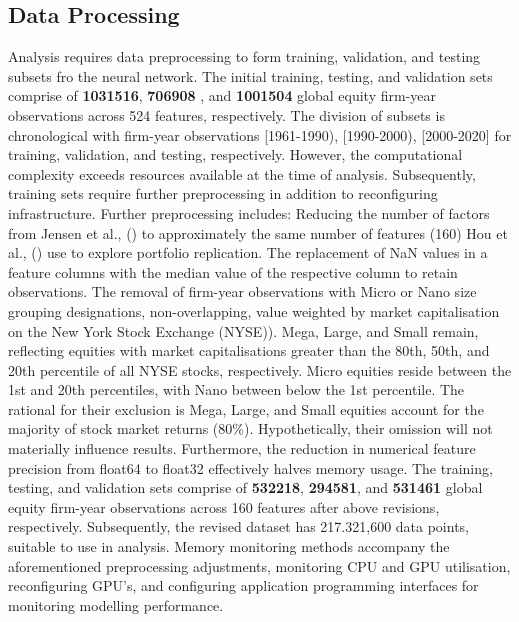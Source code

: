 \documentclass[10pt]{article}
\begin{document}
\subsection{Data Processing}
Analysis requires data preprocessing to form training, validation, and testing subsets fro the neural network. 
The initial training, testing, and validation sets comprise of \textbf{1031516}, \textbf{706908 }, and \textbf{1001504} global equity firm-year observations across 524 features, respectively.
The division of subsets is chronological with firm-year observations [1961-1990), [1990-2000), [2000-2020] for training, validation, and testing, respectively.
However, the computational complexity exceeds resources available at the time of analysis.
Subsequently, training sets require further preprocessing in addition to reconfiguring infrastructure.
Further preprocessing includes: Reducing the number of factors from Jensen et al., (\citeyear{jensen2021there}) to approximately the same number of features (160) Hou et al., (\citeyear{hou2020replicating}) use to explore portfolio replication.
The replacement of NaN values in a feature columns with the median value of the respective column to retain observations.
The removal of firm-year observations with Micro or Nano size grouping designations, non-overlapping, value weighted by market capitalisation on the New York Stock Exchange (NYSE)). 
Mega, Large, and Small remain, reflecting equities with market capitalisations greater than the 80th, 50th, and 20th percentile of all NYSE stocks, respectively.
Micro equities reside between the 1st and 20th percentiles, with Nano between below the 1st percentile. The rational for their exclusion is Mega, Large, and Small equities account for the majority of stock market returns (80\%). 
Hypothetically, their omission will not materially influence results. 
Furthermore, the reduction in numerical feature precision from float64 to float32 effectively halves memory usage. 
The training, testing, and validation sets comprise of \textbf{532218}, \textbf{294581}, and \textbf{531461} global equity firm-year observations across 160 features after above revisions, respectively.
Subsequently, the revised dataset has 217.321,600 data points, suitable to use in analysis.
Memory monitoring methods accompany the aforementioned preprocessing adjustments, monitoring CPU and GPU utilisation, reconfiguring GPU's, and configuring application programming interfaces for monitoring modelling performance.
\end{document}
